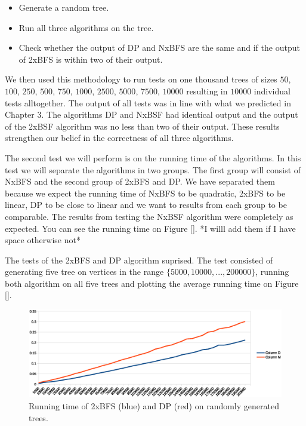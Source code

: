 \begin{itemize}
    \item Generate a random tree.
    \item Run all three algorithms on the tree.
    \item Check whether the output of DP and NxBFS are the same and if the output of 2xBFS is within two of their output.
\end{itemize}

We then used this methodology to run tests on one thousand trees of sizes $50$, $100$, $250$, $500$, $750$, $1000$, $2500$, $5000$, $7500$, $10000$ resulting in $10000$ individual tests alltogether. The output of all tests was in line with what we predicted in Chapter 3. The algorithms DP and NxBSF had identical output and the output of the 2xBSF algorithm was no less than two of their output. These results strengthen our belief in the correctness of all three algorithms.

The second test we will perform is on the running time of the algorithms. In this test we will separate the algorithms in two groups. The first group will consist of NxBFS and the second group of 2xBFS and DP. We have separated them because we expect the running time of NxBFS to be quadratic, 2xBFS to be linear, DP to be close to linear and we want to results from each group to be comparable. The results from testing the NxBSF algorithm were completely as expected. You can see the running time on Figure []. *I willl add them if I have space otherwise not*

The tests of the 2xBFS and DP algorithm suprised. The test consisted of generating five tree on vertices in the range $\{5000, 10000, ..., 200000\}$, running both algorithm on all five trees and plotting the average running time on Figure [].

\begin{figure}[h]%
    \centering
    \includegraphics[center, scale=0.6 ]{./images/running-time-new.eps}
    \caption{Running time of 2xBFS (blue) and DP (red) on randomly generated trees. }%
    \label{fig:case1.1}%
\end{figure}

